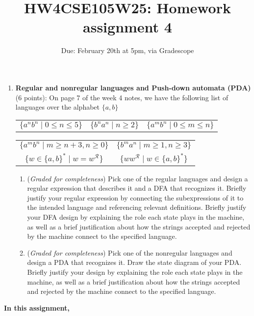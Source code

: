 \documentclass[12pt, oneside]{article}
\newcommand{\gradeComplete}{({\it Graded for completeness}) }
\begin{document}
\begin{enumerate}[wide, labelwidth=!, labelindent=0pt]
\item \textbf{Regular and nonregular languages and Push-down automata (PDA)} (6 points): 
On page 7 of the week 4 notes, we have the following list of languages over the alphabet $\{a,b\}$

\begin{center}
\begin{tabular}{ccc}
    $\{a^nb^n \mid 0  \leq n  \leq 5 \}$
    &$\{b^n a^n \mid  n  \geq 2\}$
    &$\{a^m b^n \mid  0 \leq m\leq n\}$
\end{tabular}
\begin{tabular}{cc}
    $\{a^m b^n \mid  m \geq n+3,  n \geq 0\}$
    &$\{b^m a^n \mid  m \geq 1, n \geq  3\}$\\
    $\{ w  \in \{a,b\}^* \mid w = w^\mathcal{R} \}$
    &$\{ ww^\mathcal{R} \mid w\in \{a,b\}^* \}$ \\
\end{tabular}
\end{center}
\begin{enumerate}
    \item\gradeComplete Pick one of the regular languages and design a regular expression that describes it and a DFA that recognizes it. 
    Briefly justify your regular expression by connecting
    the subexpressions of it to the intended language and referencing relevant definitions. Briefly justify your DFA design by explaining the role each state plays in the machine, 
    as well as a brief 
    justification about how the strings accepted and rejected by the machine connect to the specified language.
    \item\gradeComplete Pick one of the nonregular languages and design a PDA that recognizes it. Draw the state diagram of 
    your PDA. Briefly justify your design by explaining the role each state plays in the machine, 
    as well as a brief 
    justification about how the strings accepted and rejected by the machine connect to the specified language.
\end{enumerate}
\end{enumerate}
\newpage

\title{HW4CSE105W25: Homework assignment 4}
\date{Due: February 20th at 5pm, via Gradescope}


\maketitle
\thispagestyle{fancy}

{\bf In this assignment,}
\end{document}
